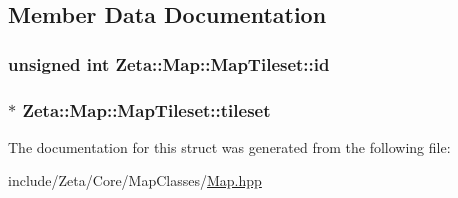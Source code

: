 \subsection{Member Data Documentation}
\hypertarget{structZeta_1_1Map_1_1MapTileset_ae4c1d0dd4b98d9cefd633593fb0a0207}{
\subsubsection[{id}]{\setlength{\rightskip}{0pt plus 5cm}unsigned int Zeta\+::\+Map\+::\+Map\+Tileset\+::id}}\label{structZeta_1_1Map_1_1MapTileset_ae4c1d0dd4b98d9cefd633593fb0a0207}
\hypertarget{structZeta_1_1Map_1_1MapTileset_a36dd1867bb6d3c2e35567c22bfc23f1b}{
\subsubsection[{tileset}]{$\ast$ Zeta\+::\+Map\+::\+Map\+Tileset\+::tileset}}\label{structZeta_1_1Map_1_1MapTileset_a36dd1867bb6d3c2e35567c22bfc23f1b}


The documentation for this struct was generated from the following file\+:\begin{DoxyCompactItemize}
\item 
include/\+Zeta/\+Core/\+Map\+Classes/\hyperlink{Map_8hpp}{Map.\+hpp}\end{DoxyCompactItemize}
